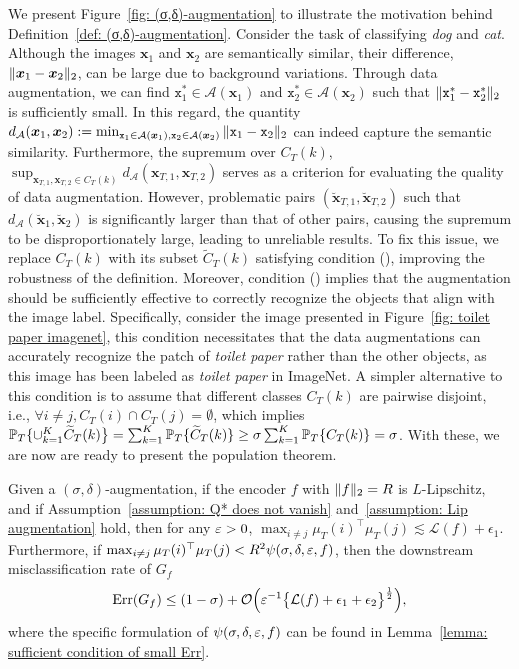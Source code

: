 We present Figure~\ref{fig: (σ,δ)-augmentation} to illustrate the motivation behind Definition~\ref{def: (σ,δ)-augmentation}. Consider the task of classifying \textit{dog} and \textit{cat}. Although the images $\bm{x}_1$ and $\bm{x}_2$ are semantically similar, their difference, $\norm{\bm{x}_1 - \bm{x}_2}_2$, can be large due to background variations. Through data augmentation, we can find $\mathtt{x}_1^* \in \mathcal{A}(\bm{x}_1)$ and $\mathtt{x}_2^* \in \mathcal{A}(\bm{x}_2)$ such that $\norm{\mathtt{x}_1^* - \mathtt{x}_2^*}_2$ is sufficiently small. In this regard, the quantity $d_{\mathcal{A}}(\bm{x}_1, \bm{x}_2):=\min_{\mathtt{x}_1 \in \mathcal{A}(\bm{x}_1), \mathtt{x}_2 \in \mathcal{A}(\bm{x}_2)}\norm{\mathtt{x}_1 - \mathtt{x}_2}_2$ can indeed capture the semantic similarity. Furthermore, the supremum over $C_T(k)$, $\sup_{\bm{x}_{T, 1},\bm{x}_{T, 2} \in C_T(k)}d_\mathcal{A}(\bm{x}_{T,1}, \bm{x}_{T,2})$ serves as a criterion for evaluating the quality of data augmentation. However, problematic pairs $(\breve{\bm{x}}_{T,1}, \breve{\bm{x}}_{T,2})$ such that $d_{\mathcal{A}}(\breve{\bm{x}}_1, \breve{\bm{x}}_2)$ is significantly larger than that of other pairs, causing the supremum to be disproportionately large, leading to unreliable results. To fix this issue, we replace $C_T(k)$ with its subset $\widetilde{C}_T(k)$ satisfying condition (), improving the robustness of the definition. Moreover, condition () implies that the augmentation should be sufficiently effective to correctly recognize the objects that align with the image label. Specifically, consider the image presented in Figure~\ref{fig: toilet paper imagenet}, this condition necessitates that the data augmentations can accurately recognize the patch of \textit{toilet paper} rather than the other objects, as this image has been labeled as \textit{toilet paper} in ImageNet. A simpler alternative to this condition is to assume that different classes $C_T(k)$ are pairwise disjoint, i.e., $\forall i \neq j, C_T(i) \cap C_T(j) = \emptyset$, which implies $\P_T\{\cup_{k=1}^K\widetilde{C}_T(k)\big\} = \sum_{k=1}^K\P_T\{\widetilde{C}_T(k)\} \geq \sigma\sum_{k=1}^K\P_T\{C_T(k)\} = \sigma$. With these, we are now are ready to present the population theorem.
\begin{theorem}
\label{theorem: pop theorem}
Given a $(\sigma, \delta)$-augmentation, if the encoder $f$ with $\norm{f}_2=R$ is $L$-Lipschitz, and if Assumption~\ref{assumption: Q* does not vanish} and~\ref{assumption: Lip augmentation} hold, then for any $\eps > 0$, $\max_{i \neq j}\mu_T(i)^{\top}\mu_T(j) \lesssim \mathcal{L}(f) + \epsilon_1$. Furthermore, if $\max_{i\neq j}\mu_T(i)^{\top}\mu_T(j) < R^2\psi(\sigma, \delta, \eps, f)$, then the downstream misclassification rate of $G_f$
\begin{align*}
\mathrm{Err}(G_f) \leq (1 - \sigma) + \mathcal{O}\Big(\eps^{-1}\big\{\mathcal{L}(f) + \epsilon_1 + \epsilon_2\big\}^{\frac{1}{2}}\Big),
\end{align*}
where the specific formulation of $\psi(\sigma, \delta, \eps, f)$ can be found in Lemma~\ref{lemma: sufficient condition of small Err}.
\end{theorem}
